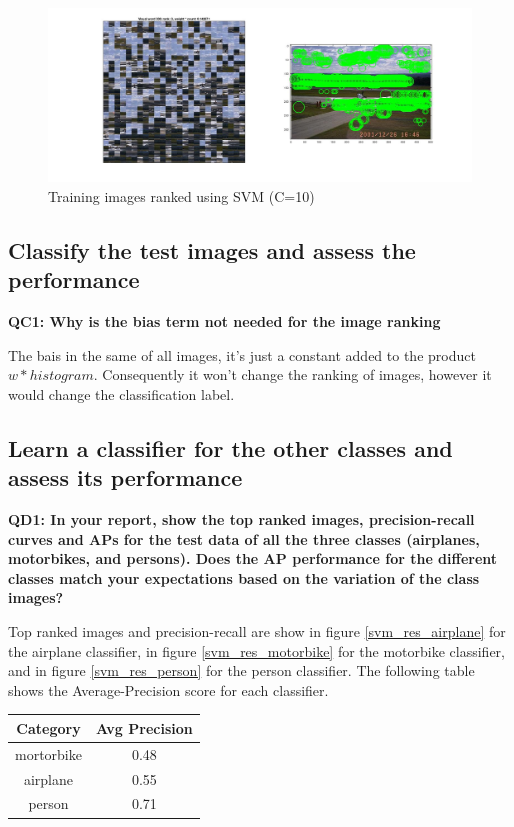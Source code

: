 \documentclass[a4paper,11pt]{exam}
\begin{document}
\begin{figure}[!h]
\centering
\includegraphics[width=15cm]{figures/third_visual_word_train.jpg}
\caption{Training images ranked using SVM (C=10)}    
\label{third_visual_word_train}
\end{figure}

\subsection{Classify the test images and assess the performance}

\textbf{QC1: Why is the bias term not needed for the image ranking\\}

The bais in the same of all images, it's just a constant added to the product $w*histogram$. Consequently it won't change the ranking of images, however it would change the classification label.

\subsection{Learn a classifier for the other classes and assess its performance}

\textbf{QD1: In your report, show the top ranked images, precision-recall curves and APs for the test data of all the three classes (airplanes, motorbikes, and persons).  Does the AP performance for the different classes match your expectations based on the variation of the class images?\\}

Top ranked images and precision-recall are show in figure \ref{svm_res_airplane} for the airplane classifier, in figure \ref{svm_res_motorbike} for the motorbike classifier, and in figure \ref{svm_res_person} for the person classifier. The following table shows the Average-Precision score for each classifier.

\begin{center}
	\begin{tabular}{ c | c }
   		 \hline
		   Category & Avg Precision \\	
		   \hline
   		  mortorbike & 0.48 \\
  		  airplane & 0.55 \\
		  person & 0.71 \\
		\hline
 	\end{tabular}
\end{center}
\end{document}
